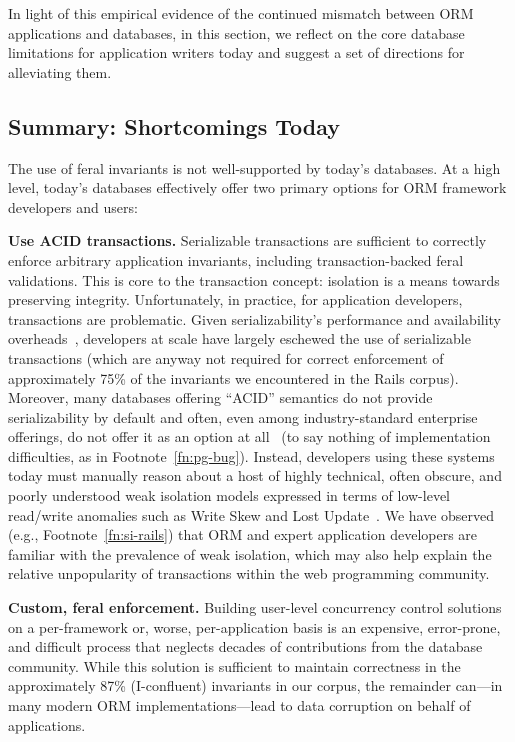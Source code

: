 In light of this empirical evidence of the continued mismatch between
ORM applications and databases, in this section, we reflect on the
core database limitations for application writers today and suggest a
set of directions for alleviating them.

\subsection{Summary: Shortcomings Today}

The use of feral invariants is not well-supported by today's
databases. At a high level, today's databases effectively offer two
primary options for ORM framework developers and users:

\begin{impenumerate}
\item \textbf{Use ACID transactions.} Serializable transactions are
  sufficient to correctly enforce arbitrary application invariants,
  including transaction-backed feral validations. This is core to the
  transaction concept: isolation is a means towards preserving
  integrity.\vspace{.5em}
  Unfortunately, in practice, for application developers, transactions
  are problematic. Given serializability's performance and
  availability overheads~\cite{brewer-cap}, developers at scale have
  largely eschewed the use of serializable transactions (which are
  anyway not required for correct enforcement of approximately 75\% of
  the invariants we encountered in the Rails corpus). Moreover, many
  databases offering ``ACID'' semantics do not provide serializability
  by default and often, even among industry-standard enterprise
  offerings, do not offer it as an option at all~\cite{hat-vldb} (to
  say nothing of implementation difficulties, as in
  Footnote~\ref{fn:pg-bug}). Instead, developers using these systems
  today must manually reason about a host of highly technical, often
  obscure, and poorly understood weak isolation models expressed in
  terms of low-level read/write anomalies such as Write Skew and Lost
  Update~\cite{adya-isolation,consistency-borders}. We have observed
  (e.g., Footnote~\ref{fn:si-rails}) that ORM and expert application
  developers are familiar with the prevalence of weak isolation, which
  may also help explain the relative unpopularity of transactions
  within the web programming community.

\item\textbf{Custom, feral enforcement.} Building user-level
  concurrency control solutions on a per-framework or, worse,
  per-application basis is an expensive, error-prone, and difficult
  process that neglects decades of contributions from the database 
  community. While this solution is sufficient to maintain correctness
  in the approximately 87\% (I-confluent) invariants in our corpus, the remainder
  can---in many modern ORM implementations---lead to data corruption on
  behalf of applications. \vspace{.5em}


\end{impenumerate}
